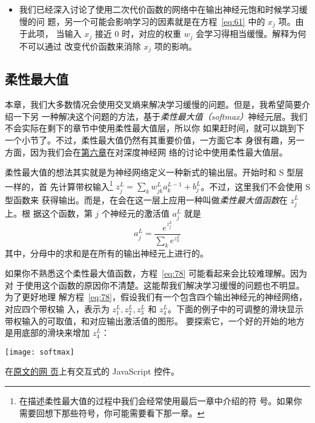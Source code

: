 \begin{itemize}
\item 我们已经深入讨论了使用二次代价函数的网络中在输出神经元饱和时候学习缓慢的问
  题，另一个可能会影响学习的因素就是在方程~\eqref{eq:61} 中的 $x_j$ 项。由于此项，
  当输入 $x_j$ 接近 $0$ 时，对应的权重 $w_j$ 会学习得相当缓慢。解释为何不可以通过
  改变代价函数来消除 $x_j$ 项的影响。
\end{itemize}

\subsection{柔性最大值}

本章，我们大多数情况会使用交叉熵来解决学习缓慢的问题。但是，我希望简要介绍一下另
一种解决这个问题的方法，基于\emph{柔性最大值（softmax）}神经元层。我们不会实际在剩下的章节中使用柔性最大值层，所以你
如果赶时间，就可以跳到下一个小节了。不过，柔性最大值仍然有其重要价值，一方面它本
身很有趣，另一方面，因为我们会在\hyperref[ch:Deeplearning]{第六章}在对深度神经网
络的讨论中使用柔性最大值层。

柔性最大值的想法其实就是为神经网络定义一种新式的输出层。开始时和 S 型层一样的，首
先计算带权输入\footnote{在描述柔性最大值的过程中我们会经常使用最后一章中介绍的符
  号。如果你需要回想下那些符号，你可能需要看下那一章。}
$z^L_j = \sum_{k} w^L_{jk} a^{L-1}_k + b^L_j$。不过，这里我们不会使用 S 型函数来
获得输出。而是，在会在这一层上应用一种叫做\emph{柔性最大值函数}在 $z^L_j$ 上。根
据这个函数，第 $j$ 个神经元的激活值 $a^L_j$ 就是
\begin{equation}
  a^L_j = \frac{e^{z^L_j}}{\sum_k e^{z^L_k}}
  \label{eq:78}\tag{78}
\end{equation}
其中，分母中的求和是在所有的输出神经元上进行的。

如果你不熟悉这个柔性最大值函数，方程~\eqref{eq:78} 可能看起来会比较难理解。因为对
于使用这个函数的原因你不清楚。这能帮我们解决学习缓慢的问题也不明显。为了更好地理
解方程~\eqref{eq:78}，假设我们有一个包含四个输出神经元的神经网络，对应四个带权输
入，表示为 $z^L_1, z^L_2, z^L_3$ 和
$z^L_4$。下面的例子中的可调整的滑块显示带权输入的可取值，和对应输出激活值的图形。
要探索它，一个好的开始的地方是用底部的滑块来增加 $z^L_4$：

\begin{center}
  \texttt{[image: softmax]}
\end{center}

在\href{http://neuralnetworksanddeeplearning.com/chap3.html#softmax}{原文的网
  页}上有交互式的 JavaScript 控件。

